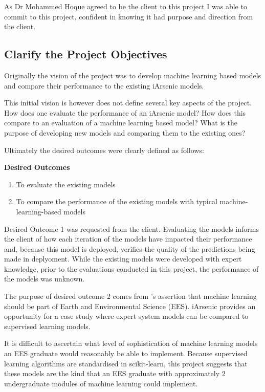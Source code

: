 As Dr Mohammed Hoque agreed to be the client to this project I was able to commit to this project, confident in knowing it had purpose and direction from the client.

\subsection{Clarify the Project Objectives}

Originally the vision of the project was to develop machine learning based models and compare their performance to the existing iArsenic models.

This initial vision is however does not define several key aspects of the project. How does one evaluate the performance of an iArsenic model? How does this compare to an evaluation of a machine learning based model? What is the purpose of developing new models and comparing them to the existing ones?

Ultimately the desired outcomes were clearly defined as follows:

\textbf{Desired Outcomes}

\begin{enumerate}
  \label{desired_outcomes}
  \item To evaluate the existing models
  \item To compare the performance of the existing models with typical machine-learning-based models
\end{enumerate}

Desired Outcome 1 was requested from the client. Evaluating the models informs the client of how each iteration of the models have impacted their performance and, because this model is deployed, verifies the quality of the predictions being made in deplyoment.  While the existing models were developed with expert knowledge, prior to the evaluations conducted in this project, the performance of the models was unknown.

The purpose of desired outcome 2 comes from \cite{Fleming2021}'s assertion that machine learning should be part of Earth and Environmental Science (EES). iArsenic provides an opportunity for a case study where expert system models can be compared to supervised learning models. 

It is difficult to ascertain what level of sophistication of machine learning models an EES graduate would reasonably be able to implement.  Because supervised learning algorithms are standardised in scikit-learn, this project suggests that these models are the kind that an EES graduate with approximately 2 undergraduate modules of machine learning could implement.

